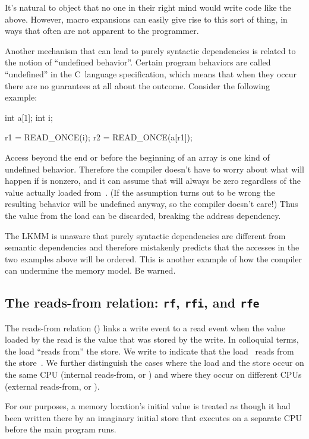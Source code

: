 It's natural to object that no one in their right mind would write
code like the above.
However, macro expansions can easily give rise to this sort of thing,
in ways that often are not apparent to the programmer.

Another mechanism that can lead to purely syntactic dependencies is
related to the notion of ``undefined behavior''.
Certain program behaviors are called ``undefined'' in the C~language
specification, which means that when they occur there are no
guarantees at all about the outcome.
Consider the following example:

\begin{VerbatimU}
	int a[1];
	int i;

	r1 = READ_ONCE(i);
	r2 = READ_ONCE(a[r1]);
\end{VerbatimU}

Access beyond the end or before the beginning of an array is one kind
of undefined behavior.
Therefore the compiler doesn't have to worry about what will happen
if  is nonzero, and it can assume that  will always be
zero regardless of the value actually loaded from~.
(If the assumption turns out to be wrong the resulting behavior will
be undefined anyway, so the compiler doesn't care!)
Thus the value from the load can be discarded, breaking the address
dependency.

The LKMM is unaware that purely syntactic dependencies are different
from semantic dependencies and therefore mistakenly predicts that the
accesses in the two examples above will be ordered.
This is another example of how the compiler can undermine the memory
model.
Be warned.


\subsection{The reads-from relation: \texttt{rf}, \texttt{rfi}, and \texttt{rfe}}
\label{sec:docs:explanation:The reads-from relation: rf, rfi, and rfe}

The reads-from relation () links a write event to a read event when
the value loaded by the read is the value that was stored by the
write.
In colloquial terms, the load ``reads from'' the store.
We write  to indicate that the load~ reads from
the store~.
We further distinguish the cases where the load and the store occur on
the same CPU (internal reads-from, or ) and where they occur on
different CPUs (external reads-from, or ).

For our purposes, a memory location's initial value is treated as
though it had been written there by an imaginary initial store that
executes on a separate CPU before the main program runs.

